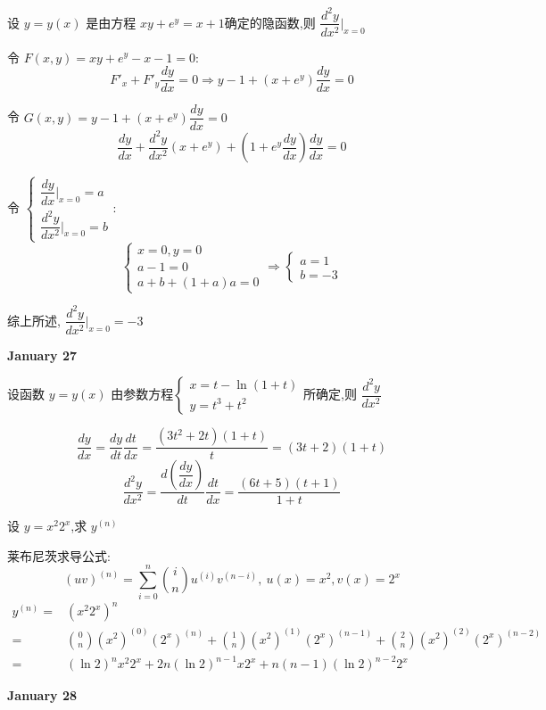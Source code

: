 \begin{example}[][Exam: 27.4.10]
	设 $y=y(x)$ 是由方程 $xy+e^{y}=x+1$确定的隐函数,则 $\dfrac{d^{2}y}{dx^{2}}\big|_{x=0}$
\end{example}

\begin{solution}

	令 $F(x,y) = xy+e^{y}-x-1 = 0$:
	$$F'_{x} +F'_{y}\dfrac{dy}{dx} = 0\Rightarrow y-1+(x+e^{y})\dfrac{dy}{dx} = 0$$

	令 $G(x,y) = y-1+(x+e^{y})\dfrac{dy}{dx} = 0$
	$$\dfrac{dy}{dx}+\dfrac{d^{2}y}{dx^{2}}(x+e^{y})+ (1+e^{y}\dfrac{dy}{dx})\dfrac{dy}{dx}= 0$$

	令 $\begin{cases} \dfrac{dy}{dx}\big|_{x=0} =a\\\dfrac{d^{2}y}{dx^{2}}\big|_{x=0} =b \end{cases}$:
	$$\begin{cases}
		x = 0,y = 0\\
		a - 1 = 0\\
		a + b + (1+a)a = 0
	\end{cases}\Rightarrow \begin{cases} a = 1\\b = -3\end{cases}$$

	综上所述, $\dfrac{d^{2}y}{dx^{2}}\big|_{x=0} = -3$
\end{solution}
\textcolor{purplea}{\textbf{January 27}}

\begin{example}[][Exam: 27.4.11]
	设函数 $y=y(x)$ 由参数方程$\begin{cases}
		x=t-\ln(1+t)\\y=t^{3}+t^{2}
	\end{cases}$所确定,则 $\dfrac{d^{2}y}{dx^{2}}$
\end{example}

\begin{solution}

	$$\dfrac{dy}{dx} = \dfrac{dy}{dt}\dfrac{dt}{dx} = \dfrac{(3t^{2}+2t)(1+t)}{t} = (3t+2)(1+t)$$
	$$\dfrac{d^{2}y}{dx^{2}} = \dfrac{d(\dfrac{dy}{dx})}{dt}\dfrac{dt}{dx}=\dfrac{(6t+5)(t+1)}{1+t}$$
\end{solution}

\begin{example}[][Exam: 27.4.12]
	设 $y=x^{2}2^{x}$,求 $y^{(n)}$
\end{example}

\begin{solution}

	莱布尼茨求导公式: 
	$$(uv)^{(n)} = \sum\limits_{i = 0}^{n}\binom{i}{n}u^{(i)}v^{(n-i)},\ u(x) = x^{2}, v(x) = 2^{x}$$
	\begin{align*}
		y^{(n)} = & (x^{2}2^{x})^{n}\\
		        = & \binom{0}{n}(x^{2})^{(0)}(2^{x})^{(n)}+\binom{1}{n}(x^{2})^{(1)}(2^{x})^{(n-1)}+\binom{2}{n}(x^{2})^{(2)}(2^{x})^{(n-2)}\\
				= & (\ln 2)^{n}x^{2}2^{x} + 2n(\ln 2)^{n-1}x2^{x}+n(n-1)(\ln 2)^{n-2}2^{x}
	\end{align*}
\end{solution}
\textcolor{purplea}{\textbf{January 28}}

